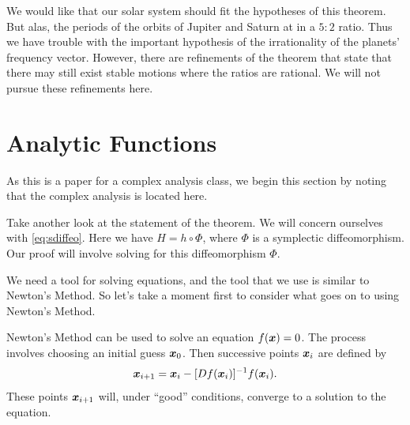 \documentclass[twoside,letterpaper,10pt]{article}
\numberwithin{equation}{section}
\begin{document}
We would like that our solar system should fit the hypotheses of this theorem.
But alas, the periods of the orbits of Jupiter and Saturn at in a $5 : 2$ ratio.
Thus we have trouble with the important hypothesis of the irrationality of the
planets' frequency vector.
However, there are refinements of the theorem that state that there may still
exist stable motions where the ratios are rational.
We will not pursue these refinements here.

\section{Analytic Functions}
\label{sec:analytic-functions}

As this is a paper for a complex analysis class, we begin this section by noting
that the complex analysis is located here.

Take another look at the statement of the theorem.
We will concern ourselves with \cref{eq:sdiffeo}.
Here we have $H = h \circ \Phi$, where $\Phi$ is a symplectic diffeomorphism.
Our proof will involve solving for this diffeomorphism $\Phi$.

We need a tool for solving equations, and the tool that we use is similar to
Newton's Method.
So let's take a moment first to consider what goes on to using Newton's Method.

Newton's Method can be used to solve an equation $f(\bm{x}) = 0$.
The process involves choosing an initial guess $\bm{x}_0$.
Then successive points $\bm{x}_i$ are defined by
\begin{equation*}
  \bm{x}_{i+1} = \bm{x}_i - [Df(\bm{x}_i)]^{-1} f(\bm{x}_i).
\end{equation*}
These points $\bm{x}_{i+1}$ will, under ``good'' conditions, converge to a
solution to the equation.
\end{document}
